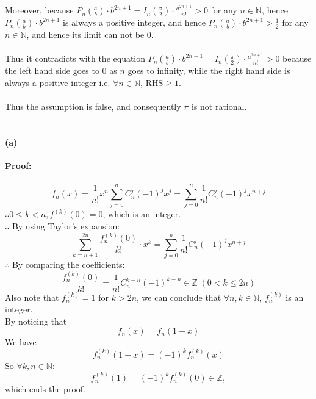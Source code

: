 \documentclass{article}
\def\N{\mathbb{N}}
\begin{document}
\\\\Moreover, because $P_n\left(\frac{a}{b}\right)\cdot b^{2n+1}=I_n\left(\frac{\pi}{2}\right)\cdot \frac{a^{2n+1}}{n!}>0$ for any $n\in \N$, hence $P_n\left(\frac{a}{b}\right)\cdot b^{2n+1}$ is always a positive integer, and hence $P_n\left(\frac{a}{b}\right)\cdot b^{2n+1}>\frac{1}{2}$ for any $n\in \N$, and hence its limit can not be 0.
\\\\Thus it contradicts with the equation $P_n\left(\frac{a}{b}\right)\cdot b^{2n+1}=I_n\left(\frac{\pi}{2}\right)\cdot \frac{a^{2n+1}}{n!}>0$ because the left hand side goes to $0$ as $n$ goes to infinity, while the right hand side is always a positive integer i.e. $\forall n\in \N$, $\text{RHS}\ge 1$.
\\\\Thus the assumption is false, and consequently $\pi$ is not rational.

\section{} %
\paragraph{(a)}\textbf{Proof:}
\\\\
$$f_n(x)=\frac{1}{n!}x^n\sum_{j=0}^{n}C_n^j(-1)^jx^j=
\sum_{j=0}^{n}\frac{1}{n!}C_n^j(-1)^jx^{n+j}$$
$\therefore 0\leq k<n,f^{(k)}(0)=0$, which is an integer.\\
$\therefore$ By using Taylor's expansion:
$$\sum_{k=n+1}^{2n}\frac{f_n^{(k)}(0)}{k!}\cdot x^k=\sum_{j=0}^{n}\frac{1}{n!}C_n^j(-1)^jx^{n+j}$$
$\therefore$ By comparing the coefficients:
$$\frac{f_n^{(k)}(0)}{k!}=\frac{1}{n!}C^{k-n}_n(-1)^{k-n}\in \mathbb{Z} \; (0<k\leq 2n)$$
Also note that  $f^{(k)}_n=1$ for $k>2n$, we can conclude that $\forall n,k\in \mathbb{N}$, $f^{(k)}_n$ is an integer.\\
By noticing that
$$f_n(x)=f_n(1-x)$$
We have
$$f^{(k)}_n(1-x)=(-1)^k f_n^{(k)}(x)$$
So $\forall k,n\in \mathbb{N}$:
 $$f^{(k)}_n(1)=(-1)^k f_n^{(k)}(0)\in \mathbb{Z},$$
 which ends the proof.\\
\end{document}
